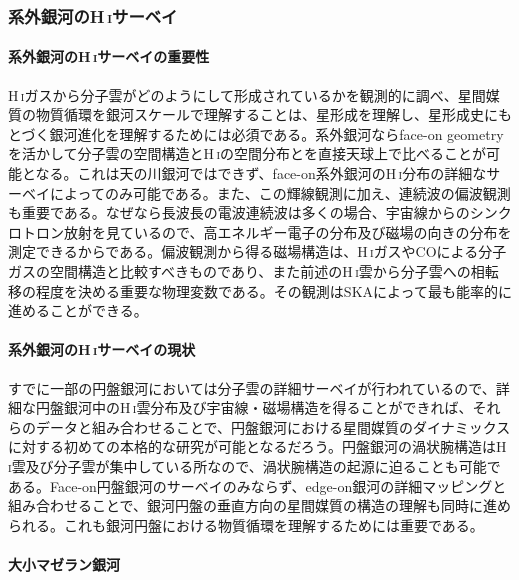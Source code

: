 \subsubsection{系外銀河のH\,\textsc{i}サーベイ}
\label{c08.s1.ss3.sss2}

\paragraph{系外銀河のH\,\textsc{i}サーベイの重要性}

H\,\textsc{i}ガスから分子雲がどのようにして形成されているかを観測的に調べ、星間媒質の物質循環を銀河スケールで理解することは、星形成を理解し、星形成史にもとづく銀河進化を理解するためには必須である。系外銀河ならface-on geometryを活かして分子雲の空間構造とH\,\textsc{i}の空間分布とを直接天球上で比べることが可能となる。これは天の川銀河ではできず、face-on系外銀河のH\,\textsc{i}分布の詳細なサーベイによってのみ可能である。また、この輝線観測に加え、連続波の偏波観測も重要である。なぜなら長波長の電波連続波は多くの場合、宇宙線からのシンクロトロン放射を見ているので、高エネルギー電子の分布及び磁場の向きの分布を測定できるからである。偏波観測から得る磁場構造は、H\,\textsc{i}ガスやCOによる分子ガスの空間構造と比較すべきものであり、また前述のH\,\textsc{i}雲から分子雲への相転移の程度を決める重要な物理変数である。その観測はSKAによって最も能率的に進めることができる。

\paragraph{系外銀河のH\,\textsc{i}サーベイの現状}

すでに一部の円盤銀河においては分子雲の詳細サーベイが行われているので\citep{2013ApJ...779...42S}、詳細な円盤銀河中のH\,\textsc{i}雲分布及び宇宙線・磁場構造を得ることができれば、それらのデータと組み合わせることで、円盤銀河における星間媒質のダイナミックスに対する初めての本格的な研究が可能となるだろう。円盤銀河の渦状腕構造はH\,\textsc{i}雲及び分子雲が集中している所なので、渦状腕構造の起源に迫ることも可能である。Face-on円盤銀河のサーベイのみならず、edge-on銀河の詳細マッピングと組み合わせることで、銀河円盤の垂直方向の星間媒質の構造の理解も同時に進められる。これも銀河円盤における物質循環を理解するためには重要である。

\paragraph{大小マゼラン銀河}


